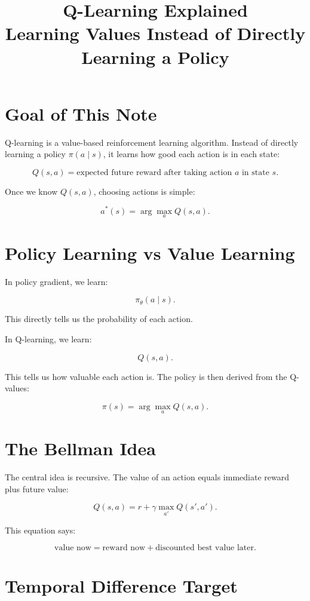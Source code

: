 \documentclass[11pt]{article}
\title{Q-Learning Explained\\
\large Learning Values Instead of Directly Learning a Policy}
\author{}
\date{}
\begin{document}
\maketitle

\section{Goal of This Note}

Q-learning is a value-based reinforcement learning algorithm.
Instead of directly learning a policy $\pi(a \mid s)$, it learns how good each action is in each state:

\[
\boxed{
Q(s,a) = \text{expected future reward after taking action } a \text{ in state } s.
}
\]

Once we know $Q(s,a)$, choosing actions is simple:

\[
a^*(s) = \arg\max_a Q(s,a).
\]

\section{Policy Learning vs Value Learning}

In policy gradient, we learn:

\[
\pi_\theta(a \mid s).
\]

This directly tells us the probability of each action.

In Q-learning, we learn:

\[
Q(s,a).
\]

This tells us how valuable each action is.
The policy is then derived from the Q-values:

\[
\pi(s) = \arg\max_a Q(s,a).
\]

\section{The Bellman Idea}

The central idea is recursive.
The value of an action equals immediate reward plus future value:

\[
\boxed{
Q(s,a)
=
r + \gamma \max_{a'} Q(s',a').
}
\]

This equation says:

\[
\text{value now}
=
\text{reward now}
+
\text{discounted best value later}.
\]

\section{Temporal Difference Target}
\end{document}
